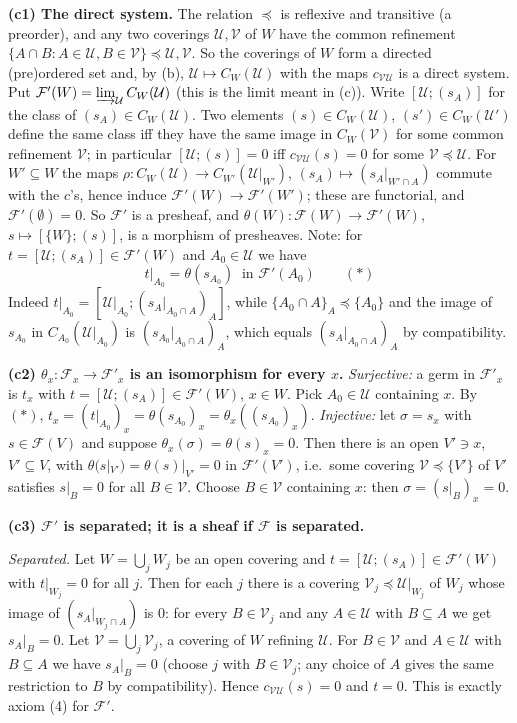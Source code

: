 \documentclass[11pt]{article}
\begin{document}
\textbf{(c1) The direct system.} The relation $\preceq$ is reflexive and transitive (a preorder), and any two coverings $\mathcal U,\mathcal V$ of $W$ have the common refinement $\{A\cap B:A\in\mathcal U,B\in\mathcal V\}\preceq\mathcal U,\mathcal V$. So the coverings of $W$ form a directed (pre)ordered set and, by (b), $\mathcal U\mapsto C_W(\mathcal U)$ with the maps $c_{\mathcal V\mathcal U}$ is a direct system. Put $\mathcal F'(W)=\varinjlim_{\mathcal U}C_W(\mathcal U)$ (this is the limit meant in (c)). Write $[\mathcal U;(s_A)]$ for the class of $(s_A)\in C_W(\mathcal U)$. Two elements $(s)\in C_W(\mathcal U)$, $(s')\in C_W(\mathcal U')$ define the same class iff they have the same image in $C_W(\mathcal V)$ for some common refinement $\mathcal V$; in particular $[\mathcal U;(s)]=0$ iff $c_{\mathcal V\mathcal U}(s)=0$ for some $\mathcal V\preceq\mathcal U$. For $W'\subseteq W$ the maps $\rho:C_W(\mathcal U)\to C_{W'}(\mathcal U|_{W'})$, $(s_A)\mapsto(s_A|_{W'\cap A})$ commute with the $c$'s, hence induce $\mathcal F'(W)\to\mathcal F'(W')$; these are functorial, and $\mathcal F'(\emptyset)=0$. So $\mathcal F'$ is a presheaf, and $\theta(W):\mathcal F(W)\to\mathcal F'(W)$, $s\mapsto[\{W\};(s)]$, is a morphism of presheaves. Note: for $t=[\mathcal U;(s_A)]\in\mathcal F'(W)$ and $A_0\in\mathcal U$ we have
\[ t|_{A_0}=\theta(s_{A_0})\ \text{ in }\mathcal F'(A_0)\qquad(*) \]
Indeed $t|_{A_0}=[\mathcal U|_{A_0};(s_A|_{A_0\cap A})_A]$, while $\{A_0\cap A\}_A\preceq\{A_0\}$ and the image of $s_{A_0}$ in $C_{A_0}(\mathcal U|_{A_0})$ is $(s_{A_0}|_{A_0\cap A})_A$, which equals $(s_A|_{A_0\cap A})_A$ by compatibility.

\textbf{(c2) $\theta_x:\mathcal F_x\to\mathcal F'_x$ is an isomorphism for every $x$.} \emph{Surjective:} a germ in $\mathcal F'_x$ is $t_x$ with $t=[\mathcal U;(s_A)]\in\mathcal F'(W)$, $x\in W$. Pick $A_0\in\mathcal U$ containing $x$. By $(*)$, $t_x=(t|_{A_0})_x=\theta(s_{A_0})_x=\theta_x((s_{A_0})_x)$. \emph{Injective:} let $\sigma=s_x$ with $s\in\mathcal F(V)$ and suppose $\theta_x(\sigma)=\theta(s)_x=0$. Then there is an open $V'\ni x$, $V'\subseteq V$, with $\theta(s|_{V'})=\theta(s)|_{V'}=0$ in $\mathcal F'(V')$, i.e.\ some covering $\mathcal V\preceq\{V'\}$ of $V'$ satisfies $s|_{B}=0$ for all $B\in\mathcal V$. Choose $B\in\mathcal V$ containing $x$: then $\sigma=(s|_B)_x=0$.

\textbf{(c3) $\mathcal F'$ is separated; it is a sheaf if $\mathcal F$ is separated.}

\emph{Separated.} Let $W=\bigcup_jW_j$ be an open covering and $t=[\mathcal U;(s_A)]\in\mathcal F'(W)$ with $t|_{W_j}=0$ for all $j$. Then for each $j$ there is a covering $\mathcal V_j\preceq\mathcal U|_{W_j}$ of $W_j$ whose image of $(s_A|_{W_j\cap A})$ is $0$: for every $B\in\mathcal V_j$ and any $A\in\mathcal U$ with $B\subseteq A$ we get $s_A|_B=0$. Let $\mathcal V=\bigcup_j\mathcal V_j$, a covering of $W$ refining $\mathcal U$. For $B\in\mathcal V$ and $A\in\mathcal U$ with $B\subseteq A$ we have $s_A|_B=0$ (choose $j$ with $B\in\mathcal V_j$; any choice of $A$ gives the same restriction to $B$ by compatibility). Hence $c_{\mathcal V\mathcal U}(s)=0$ and $t=0$. This is exactly axiom (4) for $\mathcal F'$.
\end{document}
